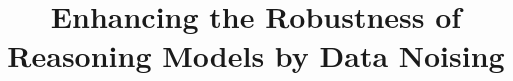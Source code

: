 \documentclass[runningheads]{llncs}
\begin{document}
%
\title{Enhancing the Robustness of Reasoning Models by Data Noising}
%
%
%
%
\end{document}
